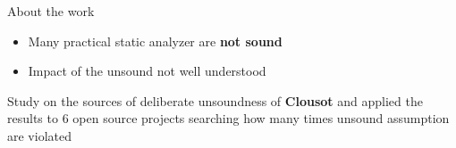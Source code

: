 \begin{frame}{About the work}

  \begin{itemize}
    \item Many practical static analyzer are \textbf{not sound}

    \vspace*{0.5cm}

    \item Impact of the unsound not well understood
  \end{itemize}

  \vfill

  Study on the sources of deliberate unsoundness of \textbf{Clousot} and
  applied the results to 6 open source projects searching how many times unsound assumption are violated

\end{frame}